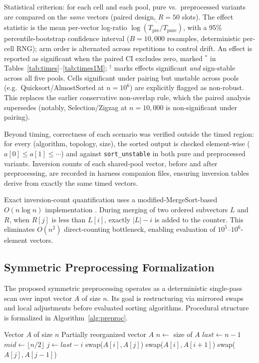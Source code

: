 \documentclass[namedate,webpdf,contemporary,large]{TBench-template}%
\theoremstyle{thmstyleone}%
\theoremstyle{thmstyletwo}%
\theoremstyle{thmstylethree}%
\begin{document}
Statistical criterion: for each cell and each pool, pure vs.\ preprocessed variants are compared on the \emph{same} vectors (paired design, $R{=}50$ slots). The effect statistic is the mean per-vector log-ratio $\overline{\log(T_{\text{pre}}/T_{\text{pure}})}$, with a 95\% percentile-bootstrap confidence interval ($B{=}10{,}000$ resamples, deterministic per-cell RNG); arm order is alternated across repetitions to control drift. An effect is reported as significant when the paired CI excludes zero, marked $^{*}$ in Tables~\ref{tab:times}--\ref{tab:times1M}; $^{\dagger}$ marks effects significant \emph{and} sign-stable across all five pools. Cells significant under pairing but unstable across pools (e.g.\ Quicksort/AlmostSorted at $n{=}10^6$) are explicitly flagged as non-robust. This replaces the earlier conservative non-overlap rule, which the paired analysis supersedes (notably, Selection/Zigzag at $n{=}10{,}000$ is non-significant under pairing).

Beyond timing, correctness of each scenario was verified outside the timed region: for every (algorithm, topology, size), the sorted output is checked element-wise ($a[0]\le a[1]\le\cdots$) and against \texttt{sort\_unstable} in both pure and preprocessed variants. Inversion counts of each shared-pool vector, before and after preprocessing, are recorded in harness companion files, ensuring inversion tables derive from exactly the same timed vectors.

Exact inversion-count quantification uses a modified-MergeSort-based $O(n \log n)$ implementation \cite{cormen_introduction_2022}. During merging of two ordered subvectors $L$ and $R$, when $R[j]$ is less than $L[i]$, exactly $|L|-i$ is added to the counter. This eliminates $O(n^2)$ direct-counting bottleneck, enabling evaluation of $10^5$--$10^6$-element vectors.

\subsection{Symmetric Preprocessing Formalization}
The proposed symmetric preprocessing operates as a deterministic single-pass scan over input vector $A$ of size $n$. Its goal is restructuring via mirrored swaps and local adjustments before evaluated sorting algorithms. Procedural structure is formalized in Algorithm~\ref{alg:preproc}.


\begin{algorithm}[!t]
\caption{Symmetric Preprocessing Algorithm}\label{alg:preproc}
\begin{algorithmic}[1]
\Require Vector $A$ of size $n$
\Ensure Partially reorganized vector $A$
\State $n \gets$ size of $A$
\State \Return
\EndIf
\State $last \gets n-1$
\State $mid \gets \lfloor n/2 \rfloor$
\State $j \gets last-i$
\State swap($A[i], A[j]$)
\EndIf
{}
\State swap($A[i], A[i+1]$)
\EndIf
\EndIf
{}
\State swap($A[j], A[j-1]$)
\EndIf
\EndIf
\EndFor
\end{algorithmic}
\end{algorithm}
\end{document}
